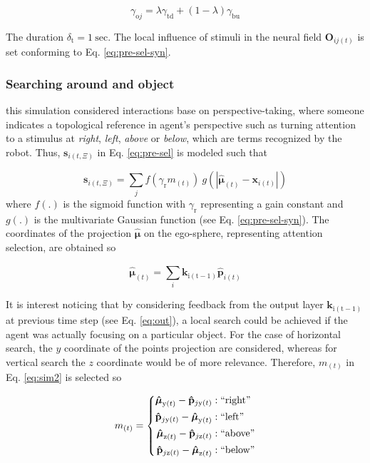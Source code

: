 \documentclass[letterpaper, 10 pt, conference]{ieeeconf}  %
\begin{document}
	 \begin{equation}
	 \gamma_{\mathrm{o}j} = \lambda\gamma_\mathrm{td}+ (1-\lambda)\gamma_\mathrm{bu}
	 \label{eq:sim1-step}
	 \end{equation}
	
	\noindent The duration $\delta_\mathrm{t} = 1\ \mathrm{sec}$. The local influence of stimuli in the neural field $\mathbf{O}_{ij(t)}$ is set conforming to Eq. \eqref{eq:pre-sel-syn}.
	
	\subsubsection{Searching around and object} this simulation considered interactions base on perspective-taking, where someone indicates a topological reference in agent's perspective such as turning attention to a stimulus at \textit{right}, \textit{left}, \textit{above} or \textit{below}, which are terms recognized by the robot. Thus, $\mathbf{s}_{i(t,\Xi)}$ in Eq. \eqref{eq:pre-sel} is modeled such that
	
	\begin{equation}
	\mathbf{s}_{i(t,\Xi)} = \sum_{j}^{} f\left(\gamma_\mathrm{r}m_{(t)}\right)\ g\left(\left|\boldsymbol{\hat{\mu}}_{(t)} - \mathbf{x}_{i(t)}\right|\right)
	\label{eq:sim2}
	\end{equation}
	\noindent where $f(.)$ is the sigmoid function with $\gamma_\mathrm{r}$ representing a gain constant and $g(.)$ is the multivariate Gaussian function (see Eq. \eqref{eq:pre-sel-syn}). The coordinates of the projection $\boldsymbol{\hat{\mu}}$ on the ego-sphere, representing attention selection, are obtained so 
	
	\begin{equation}
	\boldsymbol{\hat{\mu}}_{(t)} = \sum_{i}^{}\mathbf{k}_\mathrm{i(t-1)}\mathbf{\hat{p}}_{i(t)}
	\label{eq:sim2-mu}
	\end{equation}
	
	It is interest noticing that by considering feedback from the output layer $\mathbf{k}_\mathrm{i(t-1)}$ at previous time step (see Eq. \eqref{eq:out}), a local search could be achieved if the agent was actually focusing on a particular object. For the case of horizontal search, the $y$ coordinate of the points projection are considered, whereas for vertical search the $z$ coordinate would be of more relevance. Therefore, $m_{(t)}$ in Eq. \eqref{eq:sim2} is selected so
	
	\begin{equation}
	m_{(t)} = 
	\left\{
	\begin{split}
	\boldsymbol{\hat{\mu}}_{\mathrm{y}(t)}- \mathbf{\hat{p}}_{j\mathrm{y}(t)} & : \mathrm{``right"}\\
	\mathbf{\hat{p}}_{j\mathrm{y}(t)} - \boldsymbol{\hat{\mu}}_{\mathrm{y}(t)}& : \mathrm{``left"}\\
	\boldsymbol{\hat{\mu}}_{\mathrm{z}(t)}- \mathbf{\hat{p}}_{j\mathrm{z}(t)} & : \mathrm{``above"}\\
	\mathbf{\hat{p}}_{j\mathrm{z}(t)} - \boldsymbol{\hat{\mu}}_{\mathrm{z}(t)} & : \mathrm{``below"}\\
	\end{split}\right.
	\label{eq:sim2-m}
	\end{equation}
	
\end{document}
